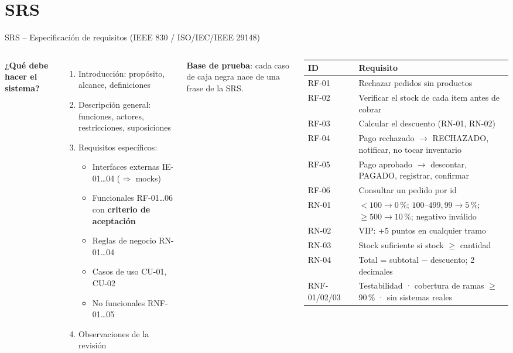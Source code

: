 \documentclass[aspectratio=169,10pt]{beamer}
\begin{document}
\section{SRS}


\begin{frame}{SRS -- Especificación de requisitos (IEEE 830 / ISO/IEC/IEEE 29148)}
\begin{columns}[T]
\small
\textbf{¿Qué debe hacer el sistema?}\\[3pt]
\scriptsize
\begin{enumerate}
  \item Introducción: propósito, alcance, definiciones
  \item Descripción general: funciones, actores, restricciones, suposiciones
  \item Requisitos específicos:
  \begin{itemize}\scriptsize
    \item Interfaces externas IE-01\ldots04 (\textcolor{acento}{$\Rightarrow$ mocks})
    \item Funcionales RF-01\ldots06 con \textbf{criterio de aceptación}
    \item Reglas de negocio RN-01\ldots04
    \item Casos de uso CU-01, CU-02
    \item No funcionales RNF-01\ldots05
  \end{itemize}
  \item Observaciones de la revisión
\end{enumerate}
\vspace{2pt}\textcolor{verde}{\faArrowRight} \textbf{Base de prueba}: cada caso de caja negra nace de una frase de la SRS.
\scriptsize
\begin{tabularx}{\linewidth}{@{}lX@{}}
\toprule
\textbf{ID} & \textbf{Requisito}\\
\midrule
RF-01 & Rechazar pedidos sin productos\\
RF-02 & Verificar el stock de cada item antes de cobrar\\
RF-03 & Calcular el descuento (RN-01, RN-02)\\
RF-04 & Pago rechazado $\rightarrow$ RECHAZADO, notificar, no tocar inventario\\
RF-05 & Pago aprobado $\rightarrow$ descontar, PAGADO, registrar, confirmar\\
RF-06 & Consultar un pedido por id\\
\midrule
RN-01 & $<100 \rightarrow 0$\,\%; $100$--$499{,}99 \rightarrow 5$\,\%; $\geq 500 \rightarrow 10$\,\%; negativo inválido\\
RN-02 & VIP: +5 puntos en cualquier tramo\\
RN-03 & Stock suficiente si stock $\geq$ cantidad\\
RN-04 & Total = subtotal $-$ descuento; 2 decimales\\
\midrule
RNF-01/02/03 & Testabilidad · cobertura de ramas $\geq$ 90\,\% · sin sistemas reales\\
\bottomrule
\end{tabularx}
\end{columns}
\end{frame}
\end{document}

